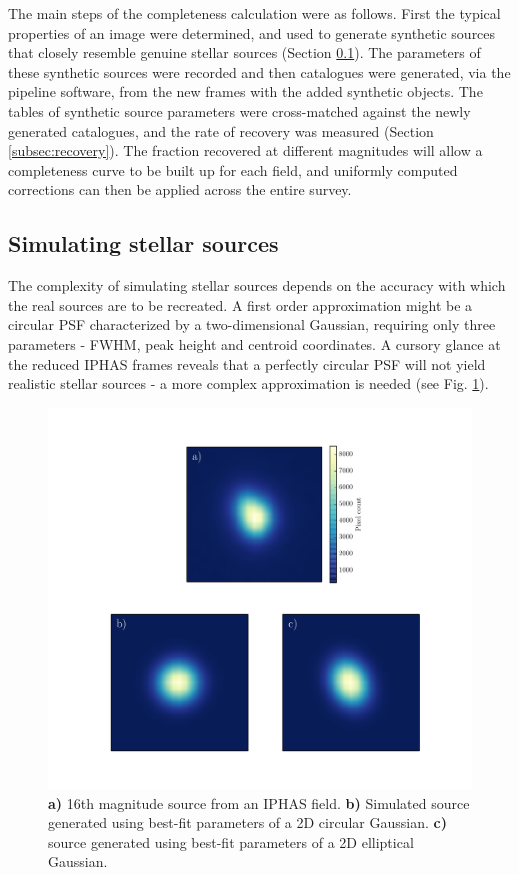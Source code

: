 \documentclass[a4paper,useAMS,usenatbib]{mn2e}
\begin{document}
The main steps of the completeness calculation were as follows. First the
typical properties of an image were determined, and used to generate synthetic
sources that closely resemble genuine stellar sources (Section \ref{subsec:artificial_sources}). 
The parameters of these synthetic sources were recorded and then catalogues were generated, via 
the pipeline software, from the new frames with the added synthetic objects. The tables of 
synthetic source parameters were cross-matched against the newly generated catalogues, and the 
rate of recovery was measured (Section \ref{subsec:recovery}). The fraction recovered at 
different magnitudes will allow a completeness curve to be built up for each field, and 
uniformly computed corrections can then be applied across the entire survey.

\subsection{Simulating stellar sources}
\label{subsec:artificial_sources}
The complexity of simulating stellar sources depends on the accuracy with which
the real sources are to be recreated. A first order approximation might be a
circular PSF characterized by a two-dimensional Gaussian, requiring only three
parameters - FWHM, peak height and centroid coordinates. A cursory glance at the reduced IPHAS frames reveals that a 
perfectly circular PSF will not yield realistic stellar sources - a more complex approximation is needed 
(see Fig. \ref{fig:fitting_profiles}).

\begin{figure}
\begin{center}
\includegraphics[width=1.0\linewidth]{figures/fitting_profiles.pdf} 
\caption{\footnotesize \textbf{a)} 16th magnitude source from an IPHAS field. 
\textbf{b)} Simulated source generated using best-fit parameters of a 2D 
circular Gaussian. \textbf{c)} source generated using best-fit parameters of 
a 2D elliptical Gaussian.}
\label{fig:fitting_profiles}
\end{center}
\end{figure}
\end{document}
